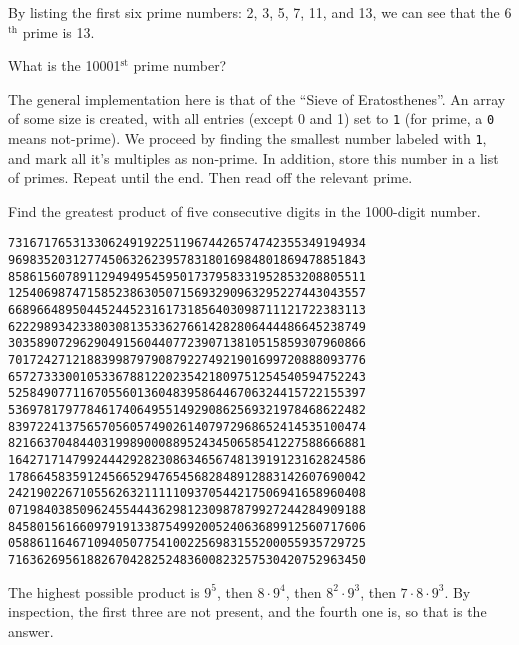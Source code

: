 


By listing the first six prime numbers: 2, 3, 5, 7, 11, and 13, we can see that the 6$^{\textrm{th}}$ prime is 13.

What is the 10001$^{\textrm{st}}$ prime number?


The general implementation here is that of the ``Sieve of Eratosthenes''.  An array of some size is created,
with all entries (except 0 and 1) set to \verb"1" (for prime, a \verb"0" means not-prime).
We proceed by finding the smallest number labeled with \verb"1", and mark all it's multiples as non-prime.
In addition, store this number in a list of primes.  Repeat until the end.  Then read off the relevant prime.




Find the greatest product of five consecutive digits in the 1000-digit number.
\begin{center}
\verb"73167176531330624919225119674426574742355349194934"
\verb"96983520312774506326239578318016984801869478851843"
\verb"85861560789112949495459501737958331952853208805511"
\verb"12540698747158523863050715693290963295227443043557"
\verb"66896648950445244523161731856403098711121722383113"
\verb"62229893423380308135336276614282806444486645238749"
\verb"30358907296290491560440772390713810515859307960866"
\verb"70172427121883998797908792274921901699720888093776"
\verb"65727333001053367881220235421809751254540594752243"
\verb"52584907711670556013604839586446706324415722155397"
\verb"53697817977846174064955149290862569321978468622482"
\verb"83972241375657056057490261407972968652414535100474"
\verb"82166370484403199890008895243450658541227588666881"
\verb"16427171479924442928230863465674813919123162824586"
\verb"17866458359124566529476545682848912883142607690042"
\verb"24219022671055626321111109370544217506941658960408"
\verb"07198403850962455444362981230987879927244284909188"
\verb"84580156166097919133875499200524063689912560717606"
\verb"05886116467109405077541002256983155200055935729725"
\verb"71636269561882670428252483600823257530420752963450"
\end{center}

The highest possible product is $9^5$, then $8\cdot9^4$, then $8^2\cdot 9^3$, then $7\cdot8\cdot9^3$.
By inspection, the first three are not present, and the fourth one is, so that is the answer.

